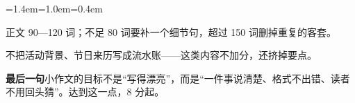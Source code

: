 \documentclass[10pt,a4paper]{ctexart}
\begin{document}
\begin{list}{}{\leftmargin=1.4em=1.0em=0.4em\itemindent=0pt\topsep=0pt\parsep=2pt\itemsep=2pt}
\item[$\square$]{\footnotesize 正文 90—120 词；不足 80 词要补一个细节句，超过 150 词删掉重复的客套。}
\item[$\square$]{\footnotesize 不把活动背景、节日来历写成流水账——这类内容不加分，还挤掉要点。}
\end{list}\vspace{4pt}
\vspace{6pt}\noindent\colorbox{soft}{\parbox{\dimexpr\linewidth-2\fboxsep\relax}{%
\footnotesize{\color{accent}\bfseries 最后一句}\quad 小作文的目标不是“写得漂亮”，而是“一件事说清楚、格式不出错、读者不用回头猜”。达到这一点，8 分起。}}
\end{document}
